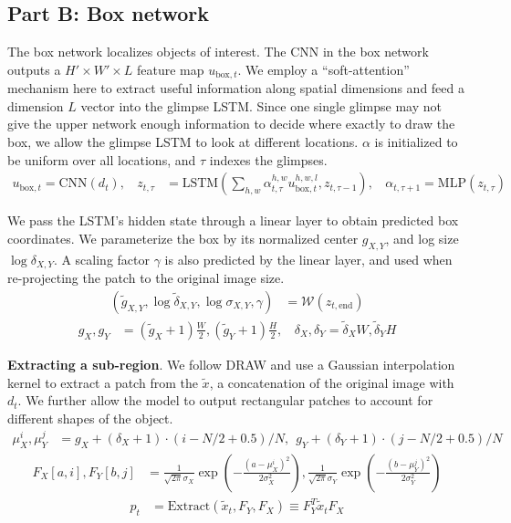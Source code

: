 \subsection{Part B: Box network}

The box network localizes objects of interest. The CNN in the box network
outputs a $H' \times W' \times L$ feature map $u_{\text{box}, t}$. We employ a
``soft-attention'' mechanism here to extract useful information along spatial
dimensions and feed a dimension $L$ vector into the glimpse LSTM. Since one
single glimpse may not give the upper network enough information to decide
where exactly to draw the box, we allow the glimpse LSTM to look at different
locations.  $\alpha$ is  initialized to be uniform over all locations, and
$\tau$ indexes the glimpses.
\vspace{-1pt}
\begin{align}
u_{\text{box},t} = \text{CNN}(d_t), \ \ \ \
z_{t, \tau} &= \text{LSTM} (
\sum_{h, w} \alpha^{h, w}_{t, \tau} u^{h,w,l}_{\text{box},t}, z_{t, \tau-1} ), \ \ \ \
\alpha_{t, \tau+1} = \text{MLP}(z_{t, \tau})
\end{align}
\vspace{-6pt}

We pass the LSTM's hidden state through a linear layer to obtain predicted
box coordinates. We parameterize the box by its normalized center
$g_{X,Y}$, and log size $\log \delta_{X,Y}$. A scaling factor $\gamma$ is
also predicted by the linear layer, and used when re-projecting the patch
to the original image size.
\vspace{-1pt}
\begin{align}
(\tilde{g}_{X,Y}, \log \tilde{\delta}_{X,Y}, \log \sigma_{X,Y}, \gamma) &= \mathcal{W}(z_{t, \text{end}})
\end{align}
\begin{align}
g_X, g_Y &= (\tilde{g}_X+1)\frac{W}{2}, (\tilde{g}_Y+1)\frac{H}{2}, \ \ \ \  
\delta_X, \delta_Y = \tilde{\delta}_X W, \tilde{\delta}_Y H
\end{align}
\vspace{-6pt}

\textbf{Extracting a sub-region}. We follow DRAW \cite{gregor15draw} and use a
Gaussian interpolation kernel to extract a patch from the $\tilde{x}$, a
concatenation of the original image with $d_t$. We further allow the model to
output rectangular patches to account for different shapes of the object.
\begin{align}
\mu_X^i, \mu_Y^j &= g_X + (\delta_X + 1) \cdot (i - N / 2 + 0.5) / N, \ \  
g_Y + (\delta_Y + 1) \cdot (j - N / 2 + 0.5) / N
\end{align}
\begin{align}
F_X[a, i], F_Y[b, j] &= 
\frac{1}{\sqrt{2\pi} \sigma_X} \exp \left(- \frac{(a -
\mu_X^i)^2}{2\sigma_X^2} \right), 
\frac{1}{\sqrt{2\pi} \sigma_Y} \exp \left(- \frac{(b -
\mu_Y^j)^2}{2\sigma_Y^2} \right)
\end{align}
\begin{align}
p_t &= \text{Extract}(\tilde{x}_t, F_Y, F_X) \equiv F_Y^T \tilde{x}_t F_X
\end{align}

